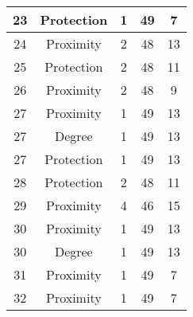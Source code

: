 \documentclass[results.tex]{subfiles}
\begin{document}
\begin{center}
\begin{tabular}{| c || c | c | c | c |}
            \hline
            23                      & Protection                   & 1                      & 49                      & 7                    \\
            \hline
            24                      & Proximity                    & 2                      & 48                      & 13                   \\
            \hline
            25                      & Protection                   & 2                      & 48                      & 11                   \\
            \hline
            26                      & Proximity                    & 2                      & 48                      & 9                    \\
            \hline
            27                      & Proximity                    & 1                      & 49                      & 13                   \\
            \hline
            27                      & Degree                       & 1                      & 49                      & 13                   \\
            \hline
            27                      & Protection                   & 1                      & 49                      & 13                   \\
            \hline
            28                      & Protection                   & 2                      & 48                      & 11                   \\
            \hline
            29                      & Proximity                    & 4                      & 46                      & 15                   \\
            \hline
            30                      & Proximity                    & 1                      & 49                      & 13                   \\
            \hline
            30                      & Degree                       & 1                      & 49                      & 13                   \\
            \hline
            31                      & Proximity                    & 1                      & 49                      & 7                    \\
            \hline
            32                      & Proximity                    & 1                      & 49                      & 7                    \\

\end{tabular}
\end{center}
\end{document}
